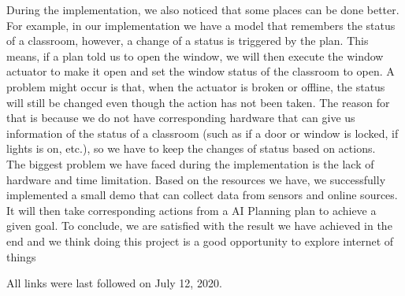 \documentclass[runningheads]{llncs}
\begin{document}
During the implementation, we also noticed that some places can be done better. For example, in our implementation we have a model that remembers the status of a classroom, however, a change of a status is triggered by the plan. This means, if a plan told us to open the window, we will then execute the window actuator to make it open and set the window status of the classroom to open. A problem might occur is that, when the actuator is broken or offline, the status will still be changed even though the action has not been taken. The reason for that is because we do not have corresponding hardware that can give us information of the status of a classroom (such as if a door or window is locked, if lights is on, etc.), so we have to keep the changes of status based on actions.\\

The biggest problem we have faced during the implementation is the lack of hardware and time limitation. Based on the resources we have, we successfully implemented a small demo that can collect data from sensors and online sources. It will then take corresponding actions from a AI Planning plan to achieve a given goal. To conclude, we are satisfied with the result we have achieved in the end and we think doing this project is a good opportunity to explore internet of things


%
%



All links were last followed on July 12, 2020.
\end{document}
